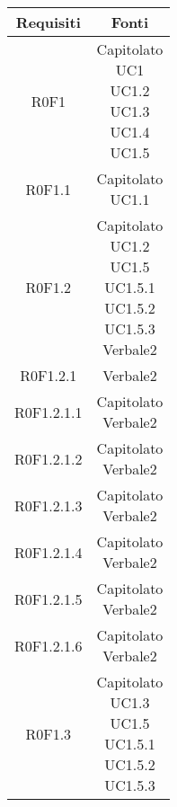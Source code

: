 \begin{center}
\begin{longtable}{|c|c|}
\hline

\textbf{Requisiti}  & \textbf{Fonti} \\
\hline
R0F1  & \parbox[t]{\dimFonti}{Capitolato \\ UC1 \\ UC1.2 \\ UC1.3 \\ UC1.4 \\ UC1.5 \\ } \\
\hline
R0F1.1  & \parbox[t]{\dimFonti}{Capitolato \\ UC1.1 \\ } \\
\hline
R0F1.2  & \parbox[t]{\dimFonti}{Capitolato \\ UC1.2 \\ UC1.5 \\ UC1.5.1 \\ UC1.5.2 \\ UC1.5.3 \\ Verbale2 \\ } \\
\hline
R0F1.2.1  & \parbox[t]{\dimFonti}{Verbale2 \\ } \\
\hline
R0F1.2.1.1  & \parbox[t]{\dimFonti}{Capitolato \\ Verbale2 \\ } \\
\hline
R0F1.2.1.2  & \parbox[t]{\dimFonti}{Capitolato \\ Verbale2 \\ } \\
\hline
R0F1.2.1.3  & \parbox[t]{\dimFonti}{Capitolato \\ Verbale2 \\ } \\
\hline
R0F1.2.1.4  & \parbox[t]{\dimFonti}{Capitolato \\ Verbale2 \\ } \\
\hline
R0F1.2.1.5  & \parbox[t]{\dimFonti}{Capitolato \\ Verbale2 \\ } \\
\hline
R0F1.2.1.6  & \parbox[t]{\dimFonti}{Capitolato \\ Verbale2 \\ } \\
\hline
R0F1.3  & \parbox[t]{\dimFonti}{Capitolato \\ UC1.3 \\ UC1.5 \\ UC1.5.1 \\ UC1.5.2 \\ UC1.5.3 \\ } \\

\end{longtable}
\end{center}
